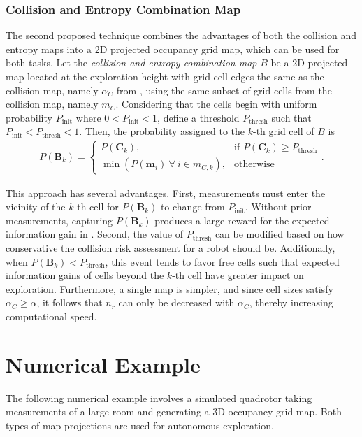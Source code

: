 \subsubsection{Collision and Entropy Combination Map}
The second proposed technique combines the advantages of both the collision and entropy maps into a 2D projected occupancy grid map, which can be used for both tasks. Let the \emph{collision and entropy combination map} $B$ be a 2D projected map located at the exploration height with grid cell edges the same as the collision map, namely $\alpha_C$ from , using the same subset of grid cells from the collision map, namely $m_C$. Considering that the cells begin with uniform probability $P_\text{init}$ where $0<P_\text{init}<1$, define a threshold $P_\text{thresh}$ such that $P_\text{init}<P_\text{thresh}<1$. Then, the probability assigned to the $k$-th grid cell of $B$ is
\begin{align}
P(\mathbf{B}_k)= 
\begin{cases}
    P(\mathbf{C}_k),			& \text{if }P(\mathbf{C}_k)\geq P_\text{thresh}\\
    \min{(P(\mathbf{m}_i)\ \forall \ i\in m_{C,k})},              & \text{otherwise}
\end{cases}.
\end{align}

This approach has several advantages. First, measurements must enter the vicinity of the $k$-th cell for $P(\mathbf{B}_k)$ to change from $P_\text{init}$. Without prior measurements, capturing $P(\mathbf{B}_k)$ produces a large reward for the expected information gain in . Second, the value of $P_\text{thresh}$ can be modified based on how conservative the collision risk assessment for a robot should be. Additionally, when $P(\mathbf{B}_k)<P_\text{thresh}$, this event tends to favor free cells such that expected information gains of cells beyond the $k$-th cell have greater impact on exploration. Furthermore, a single map is simpler, and since cell sizes satisfy $\alpha_C\geq\alpha$, it follows that $n_r$ can only be decreased with $\alpha_C$, thereby increasing computational speed.

\section{Numerical Example}

The following numerical example involves a simulated quadrotor taking measurements of a large room and generating a 3D occupancy grid map. Both types of map projections are used for autonomous exploration.

